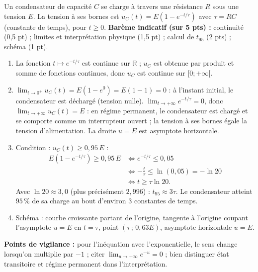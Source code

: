 \documentclass[11pt]{article}
\newcommand{\legende}[1]{\par\vspace{6pt}{\popsemi\fontsize{9}{11.5}\selectfont\color{popmuted}#1}}
\begin{document}
\begin{exoresolu}
Un condensateur de capacité $C$ se charge à travers une résistance $R$ sous une tension $E$. La tension à ses bornes est $u_C(t)=E\left(1-e^{-t/\tau}\right)$ avec $\tau=RC$ (constante de temps), pour $t\ge 0$.
\textbf{Barème indicatif (sur 5 pts) :} continuité (0,5 pt) ; limites et interprétation physique (1,5 pt) ; calcul de $t_{95}$ (2 pts) ; schéma (1 pt).
\begin{enumerate}
\item La fonction $t\mapsto e^{-t/\tau}$ est continue sur $\mathbb{R}$ ; $u_C$ est obtenue par produit et somme de fonctions continues, donc $u_C$ est continue sur $[0;+\infty[$.
\item $\lim_{t\to 0^+}u_C(t)=E(1-e^0)=E(1-1)=0$ : à l'instant initial, le condensateur est déchargé (tension nulle). $\lim_{t\to +\infty}e^{-t/\tau}=0$, donc $\lim_{t\to +\infty}u_C(t)=E$ : en régime permanent, le condensateur est chargé et se comporte comme un interrupteur ouvert ; la tension à ses bornes égale la tension d'alimentation. La droite $u=E$ est asymptote horizontale.
\item Condition : $u_C(t)\ge 0,95\,E$ :
\begin{align*}
E\left(1-e^{-t/\tau}\right)\ge 0,95\,E &\iff e^{-t/\tau}\le 0,05\\
&\iff -\frac{t}{\tau}\le \ln(0,05)=-\ln 20\\
&\iff t\ge \tau\ln 20.
\end{align*}
Avec $\ln 20\approx 3,0$ (plus précisément $2,996$) : $t_{95}\approx 3\tau$. Le condensateur atteint $95\,\%$ de sa charge au bout d'environ $3$ constantes de temps.
\item Schéma : courbe croissante partant de l'origine, tangente à l'origine coupant l'asymptote $u=E$ en $t=\tau$, point $(\tau\,;\,0,63E)$, asymptote horizontale $u=E$.
\begin{popfigure}
\begin{center}
\end{center}
\legende{Charge du condensateur : $u_C(\tau)\approx 0,63E$ ; asymptote $u=E$.}
\end{popfigure}
\end{enumerate}
\textbf{Points de vigilance :} pour l'inéquation avec l'exponentielle, le sens change lorsqu'on multiplie par $-1$ ; citer $\lim_{u\to +\infty}e^{-u}=0$ ; bien distinguer état transitoire et régime permanent dans l'interprétation.
\end{exoresolu}
\end{document}
